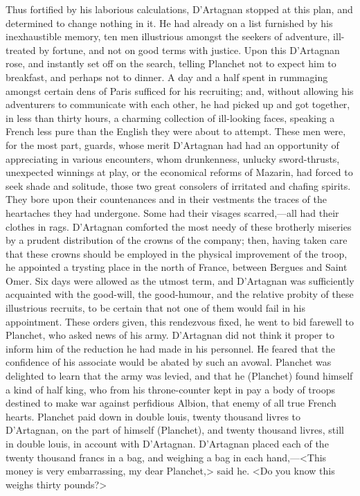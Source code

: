 Thus fortified by his laborious calculations, D'Artagnan stopped at this plan, and determined to change nothing in it. He had already on a list furnished by his inexhaustible memory, ten men illustrious amongst the seekers of adventure, ill-treated by fortune, and not on good terms with justice. Upon this D'Artagnan rose, and instantly set off on the search, telling Planchet not to expect him to breakfast, and perhaps not to dinner. A day and a half spent in rummaging amongst certain dens of Paris sufficed for his recruiting; and, without allowing his adventurers to communicate with each other, he had picked up and got together, in less than thirty hours, a charming collection of ill-looking faces, speaking a French less pure than the English they were about to attempt. These men were, for the most part, guards, whose merit D'Artagnan had had an opportunity of appreciating in various encounters, whom drunkenness, unlucky sword-thrusts, unexpected winnings at play, or the economical reforms of Mazarin, had forced to seek shade and solitude, those two great consolers of irritated and chafing spirits. They bore upon their countenances and in their vestments the traces of the heartaches they had undergone. Some had their visages scarred,—all had their clothes in rags. D'Artagnan comforted the most needy of these brotherly miseries by a prudent distribution of the crowns of the company; then, having taken care that these crowns should be employed in the physical improvement of the troop, he appointed a trysting place in the north of France, between Bergues and Saint Omer. Six days were allowed as the utmost term, and D'Artagnan was sufficiently acquainted with the good-will, the good-humour, and the relative probity of these illustrious recruits, to be certain that not one of them would fail in his appointment. These orders given, this rendezvous fixed, he went to bid farewell to Planchet, who asked news of his army. D'Artagnan did not think it proper to inform him of the reduction he had made in his personnel. He feared that the confidence of his associate would be abated by such an avowal. Planchet was delighted to learn that the army was levied, and that he (Planchet) found himself a kind of half king, who from his throne-counter kept in pay a body of troops destined to make war against perfidious Albion, that enemy of all true French hearts. Planchet paid down in double louis, twenty thousand livres to D'Artagnan, on the part of himself (Planchet), and twenty thousand livres, still in double louis, in account with D'Artagnan. D'Artagnan placed each of the twenty thousand francs in a bag, and weighing a bag in each hand,—<This money is very embarrassing, my dear Planchet,> said he. <Do you know this weighs thirty pounds?>

